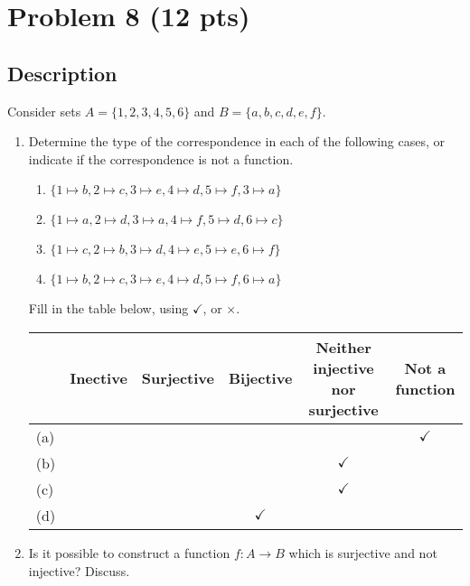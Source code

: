 \newpage


\section{Problem 8 (12 pts)}
\subsection{Description}

Consider sets $A = \{1, 2, 3, 4, 5, 6 \}$ and $B = \{ a, b, c, d, e, f \}$.

\begin{enumerate}

\item Determine the type of the correspondence in each of the following cases, or indicate if the correspondence is not a function.

\begin{enumerate}
\item $\{ 1 \mapsto b, 2 \mapsto c, 3 \mapsto e, 4 \mapsto d, 5 \mapsto f, 3 \mapsto a \}$

\item $\{ 1 \mapsto a, 2 \mapsto d, 3 \mapsto a, 4 \mapsto f, 5 \mapsto d, 6 \mapsto c \}$

\item $\{ 1 \mapsto c, 2 \mapsto b, 3 \mapsto d, 4 \mapsto e, 5 \mapsto e, 6 \mapsto f  \}$

\item $\{ 1 \mapsto b, 2 \mapsto c, 3 \mapsto e, 4 \mapsto d, 5 \mapsto f, 6 \mapsto a \}$
\end{enumerate}

\noindent Fill in the table below, using $\checkmark$, or $\times$.

\begin{center}
\begin{tabular}{|l|c|c|c|c|c|}
\hline
		& Inective		& Surjective	& Bijective 	& \multicolumn{1}{m{3cm}|}{Neither injective nor surjective}	&	Not a function	\\
\hline
(a)		& 		& 		& 	& 			&$\checkmark$  \\
\hline

(b)		& 		& 		& 		& $\checkmark$	&	 \\
\hline


(c)		& 		& 		& 	& $\checkmark$	&  \\
\hline

(d)		& 		& 		&$\checkmark$ 		&	&  \\
\hline
\end{tabular}
\end{center}


\item Is it possible to construct a function $f : A \rightarrow B$ which is surjective and not injective?  Discuss.
\end{enumerate}


